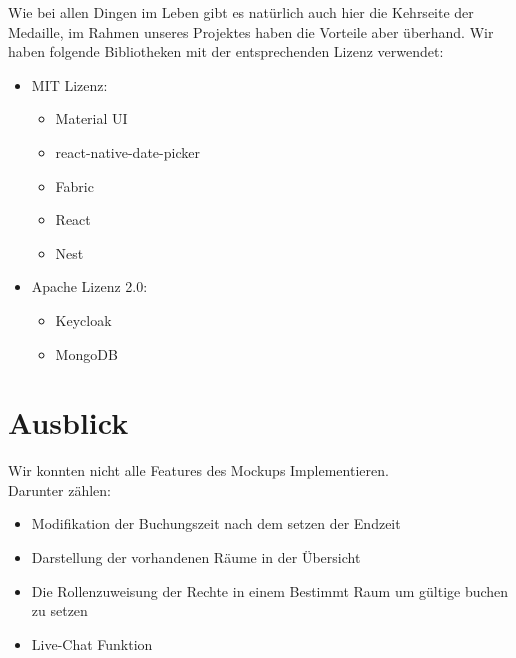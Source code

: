 Wie bei allen Dingen im Leben gibt es natürlich auch hier die Kehrseite der Medaille, im Rahmen unseres Projektes haben die Vorteile aber überhand. 
Wir haben folgende Bibliotheken mit der entsprechenden Lizenz verwendet:

\begin{itemize}
\item	MIT Lizenz:
\begin{itemize}
    \item	Material UI
    \item	react-native-date-picker
    \item	Fabric
    \item	React
    \item	Nest
\end{itemize}
\end{itemize}
\begin{itemize}
    \item	Apache Lizenz 2.0:
    \begin{itemize}
\item	Keycloak
\item	MongoDB
\end{itemize}
\end{itemize}


\section{Ausblick}
 Wir konnten nicht alle Features des Mockups Implementieren. \\
 Darunter zählen:
\begin{itemize}
    \item	Modifikation der Buchungszeit nach dem setzen der Endzeit
    \item	Darstellung der vorhandenen Räume in der Übersicht
    \item	Die Rollenzuweisung der Rechte in einem Bestimmt Raum um gültige buchen zu setzen 
    \item	Live-Chat Funktion  
\end{itemize}
